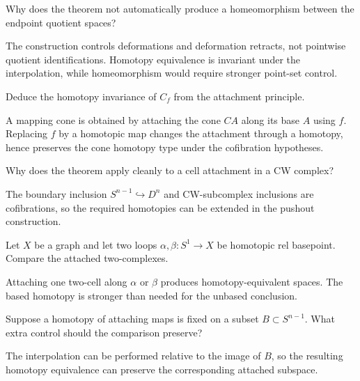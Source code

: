 \begin{problem}\label{prob:viii08-06}
Why does the theorem not automatically produce a homeomorphism between the endpoint quotient spaces?
\end{problem}
\begin{solution}
The construction controls deformations and deformation retracts, not pointwise quotient identifications.  Homotopy equivalence is invariant under the interpolation, while homeomorphism would require stronger point-set control.
\end{solution}

\begin{problem}\label{prob:viii08-07}
Deduce the homotopy invariance of \(C_f\) from the attachment principle.
\end{problem}
\begin{solution}
A mapping cone is obtained by attaching the cone \(CA\) along its base \(A\) using \(f\).  Replacing \(f\) by a homotopic map changes the attachment through a homotopy, hence preserves the cone homotopy type under the cofibration hypotheses.
\end{solution}

\begin{problem}\label{prob:viii08-08}
Why does the theorem apply cleanly to a cell attachment in a CW complex?
\end{problem}
\begin{solution}
The boundary inclusion \(S^{n-1}\hookrightarrow D^n\) and CW-subcomplex inclusions are cofibrations, so the required homotopies can be extended in the pushout construction.
\end{solution}

\begin{problem}\label{prob:viii08-09}
Let \(X\) be a graph and let two loops \(\alpha,\beta:S^1\to X\) be homotopic rel basepoint. Compare the attached two-complexes.
\end{problem}
\begin{solution}
Attaching one two-cell along \(\alpha\) or \(\beta\) produces homotopy-equivalent spaces.  The based homotopy is stronger than needed for the unbased conclusion.
\end{solution}

\begin{problem}\label{prob:viii08-10}
Suppose a homotopy of attaching maps is fixed on a subset \(B\subset S^{n-1}\). What extra control should the comparison preserve?
\end{problem}
\begin{solution}
The interpolation can be performed relative to the image of \(B\), so the resulting homotopy equivalence can preserve the corresponding attached subspace.
\end{solution}

